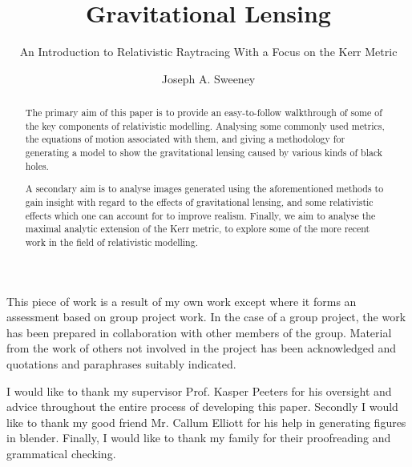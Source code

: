 \documentclass[oneside,openright,frontopenright, singlespacing]{dmathesis}
\begin{document}
\title{Gravitational Lensing}
\subtitle{An Introduction to Relativistic Raytracing With a Focus on the Kerr Metric}
\author{Joseph A. Sweeney}
\maketitlepage*

\begin{abstract}
%
	The primary aim of this paper is to provide an easy-to-follow walkthrough of some of the key components of relativistic modelling. Analysing some commonly used metrics, the equations of motion associated with them, and giving a methodology for generating a model to show the gravitational lensing caused by various kinds of black holes.

\vspace{1em}
	A secondary aim is to analyse images generated using the aforementioned methods to gain insight with regard to the effects of gravitational lensing, and some relativistic effects which one can account for to improve realism. Finally, we aim to analyse the maximal analytic extension of the Kerr metric, to explore some of the more recent work in the field of relativistic modelling.
\end{abstract}

\begin{declaration*}
%
	This piece of work is a result of my own work except where it forms an assessment based on group project work. In the case of a group project, the work has been prepared in collaboration with other members of the group. Material from the work of others not involved in the project has been acknowledged and quotations and paraphrases suitably indicated.
%
\end{declaration*}

\begin{acknowledgements}
%
	I would like to thank my supervisor Prof. Kasper Peeters for his oversight and advice throughout the entire process of developing this paper. Secondly I would like to thank my good friend Mr. Callum Elliott for his help in generating figures in blender. Finally, I would like to thank my family for their proofreading and grammatical checking.
%
\end{acknowledgements}

\disableprotrusion
\tableofcontents*
\enableprotrusion

\cleardoublepage
{}
\end{document}
